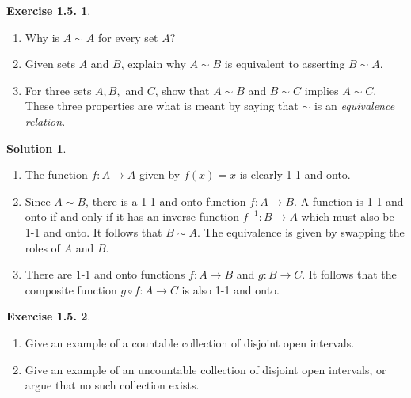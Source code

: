 \documentclass[12pt]{article}
\theoremstyle{definition}
\theoremstyle{exercise}
\newtheorem{exercise}{Exercise 1.5.}
\theoremstyle{solution}
\newtheorem*{solution}{Solution}
\begin{document}
\begin{exercise}
\label{ex:5}
    \begin{enumerate}
        \item Why is \( A \sim A \) for every set \( A \)?

        \item Given sets \( A \) and \( B \), explain why \( A \sim B \) is equivalent to asserting \( B \sim A \).

        \item For three sets \( A, B, \) and \( C \), show that \( A \sim B \) and \( B \sim C \) implies \( A \sim C \). These three properties are what is meant by saying that \( \sim \) is an \textit{equivalence relation}.
    \end{enumerate}
\end{exercise}

\begin{solution}
    \begin{enumerate}
        \item The function \( f : A \to A \) given by \( f(x) = x \) is clearly 1-1 and onto.

        \item Since \( A \sim B \), there is a 1-1 and onto function \( f : A \to B \). A function is 1-1 and onto if and only if it has an inverse function \( f^{-1} : B \to A \) which must also be 1-1 and onto. It follows that \( B \sim A \). The equivalence is given by swapping the roles of \( A \) and \( B \).

        \item There are 1-1 and onto functions \( f : A \to B \) and \( g : B \to C \). It follows that the composite function \( g \circ f : A \to C \) is also 1-1 and onto.
    \end{enumerate}
\end{solution}

\begin{exercise}
\label{ex:6}
    \begin{enumerate}
        \item Give an example of a countable collection of disjoint open intervals.

        \item Give an example of an uncountable collection of disjoint open intervals, or argue that no such collection exists.
    \end{enumerate}
\end{exercise}
\end{document}
